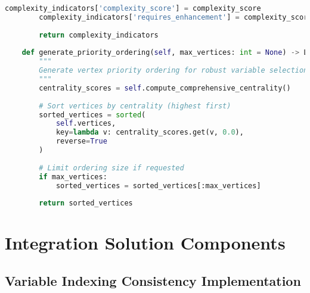 \begin{lstlisting}[language=Python, caption=Comprehensive Graph Structure Analysis Pipeline]
        complexity_indicators['complexity_score'] = complexity_score
        complexity_indicators['requires_enhancement'] = complexity_score >= 2
        
        return complexity_indicators
    
    def generate_priority_ordering(self, max_vertices: int = None) -> List[int]:
        """
        Generate vertex priority ordering for robust variable selection.
        """
        centrality_scores = self.compute_comprehensive_centrality()
        
        # Sort vertices by centrality (highest first)
        sorted_vertices = sorted(
            self.vertices, 
            key=lambda v: centrality_scores.get(v, 0.0),
            reverse=True
        )
        
        # Limit ordering size if requested
        if max_vertices:
            sorted_vertices = sorted_vertices[:max_vertices]
        
        return sorted_vertices
\end{lstlisting}

\section{Integration Solution Components}
\label{appendix:integration-solutions}

\subsection{Variable Indexing Consistency Implementation}
\label{appendix:variable-indexing}

